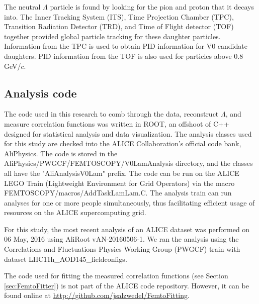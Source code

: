 The neutral $\Lambda$ particle is found by looking for the pion and proton that it decays into.
The Inner Tracking System (ITS), Time Projection Chamber (TPC), Transition Radiation Detector (TRD), and Time of Flight detector (TOF) together provided global particle tracking for these daughter particles.
Information from the TPC is used to obtain PID information for V0 candidate daughters.
PID information from the TOF is also used for particles above 0.8 GeV/$c$.


\subsection{Analysis code}
The code used in this research to comb through the data, reconstruct $\Lambda$, and measure correlation functions was written in ROOT, an offshoot of C++ designed for statistical analysis and data visualization.
The analysis classes used for this study are checked into the ALICE Collaboration's official code bank, AliPhysics.
The code is stored in the AliPhysics/PWGCF/FEMTOSCOPY/V0LamAnalysis directory, and the classes all have the "AliAnalysisV0Lam" prefix.
The code can be run on the ALICE LEGO Train (Lightweight Environment for Grid Operators) via the macro FEMTOSCOPY/macros/AddTaskLamLam.C.
The analysis train can run analyses for one or more people simultaneously, thus facilitating efficient usage of resources on the ALICE supercomputing grid.

For this study, the most recent analysis of an ALICE dataset was performed on 06 May, 2016 using AliRoot vAN-20160506-1.
We ran the analysis using the Correlations and Fluctuations Physics Working Group (PWGCF) train with dataset LHC11h\_AOD145\_fieldconfigs.

The code used for fitting the measured correlation functions (see Section \ref{sec:FemtoFitter}) is not part of the ALICE code repository.
However, it can be found online at \url{http://github.com/jsalzwedel/FemtoFitting}.
